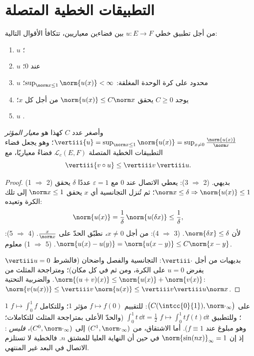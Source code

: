 \section{التطبيقات الخطية المتصلة}

\begin{theorem}[توصيف]\label{thm:b2:nvs:continuouslinear}
من أجل تطبيق خطي $u \colon E \to F$ بين فضاءين معياريين، تتكافأ
الأقوال التالية:
\begin{enumerate}
  \item $u$ ؛
  \item $u$  عند $0$؛
  \item $u$ محدود على كرة الوحدة المغلقة: $\sup_{\norm x \leq
        1} \norm{u(x)} < \infty$؛
  \item يوجد $C \geq 0$ يحقق $\norm{u(x)} \leq C \norm x$ من أجل
        كل $x$؛
  \item $u$ .
\end{enumerate}
وأصغر عدد $C$ كهذا هو \emph{معيار المؤثر}
$\vertiii{u} = \sup_{\norm x \leq 1}\norm{u(x)} = \sup_{x \neq 0}
\frac{\norm{u(x)}}{\norm x}$؛ وهو يجعل فضاء التطبيقات الخطية المتصلة $\mathcal{L}_c(E,
F)$ فضاءً معياريًا، مع
\[
\vertiii{v \circ u} \leq \vertiii v\, \vertiii u .
\]
\end{theorem}

\begin{proof}
(1 $\Rightarrow$ 2) بديهي. (2 $\Rightarrow$ 3): يعطي الاتصال عند $0$
مع $\varepsilon = 1$ عددًا $\delta$ يحقق $\norm x \leq \delta
\Rightarrow \norm{u(x)} \leq 1$؛ ثم تُنزل التجانسية أي $x$
يحقق $\norm x \leq 1$ إلى تلك الكرة وتعيده:
\[
\norm{u(x)} = \frac1\delta\,\norm{u(\delta x)} \leq
\frac1\delta ,
\]
لأن $\norm{\delta x} \leq \delta$. (3 $\Rightarrow$ 4):
من أجل $x \neq 0$، نطبّق الحدّ على $\frac{x}{\norm x}$. (4
$\Rightarrow$ 5): $\norm{u(x) - u(y)} = \norm{u(x - y)} \leq
C\norm{x - y}$. (5 $\Rightarrow$ 1) معلوم.

بديهيات  من أجل $\vertiii\cdot$: التجانسية والفصل
واضحان (فالشرط $\vertiii u = 0$ يفرض $u = 0$ على الكرة، ومن ثم في
كل مكان)؛ ومتراجحة المثلث من $\norm{(u + v)(x)} \leq
\norm{u(x)} + \norm{v(x)}$. والضربية التحتية: $\norm{v(u(x))}
\leq \vertiii v\,\norm{u(x)} \leq \vertiii v \vertiii u \norm x$.
\end{proof}

\begin{example}\label{ex:b2:nvs:operatornorms}
على $\bigl(C(\intcc{0}{1}), \norm\cdot_\infty\bigr)$: للتقييم
$f \mapsto f(0)$  مؤثر $1$؛ وللتكامل $f \mapsto
\int_0^1 f$  $1$؛ وللتطبيق $f \mapsto \int_0^1 t f(t)\dd t$
 $\int_0^1 t\,\dd t = \frac12$ (والحدّ الأعلى بمتراجحة المثلث
للتكاملات؛ وهو مبلوغ عند $f \equiv 1$). أما الاشتقاق،
من $(C^1, \norm\cdot_\infty)$ إلى $(C^0,
\norm\cdot_\infty)$، \emph{فليس} : إذ إن $\norm{\sin(nx)}_\infty
= 1$ في حين أن  النهاية العليا للمشتق $n$. فالخطية لا تستلزم
الاتصال في البعد غير المنتهي.
\end{example}

